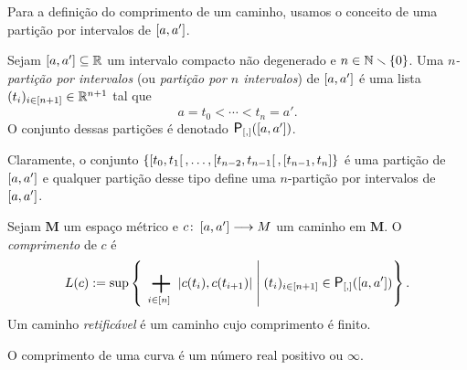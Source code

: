 Para a definição do comprimento de um caminho, usamos o conceito de uma partição por intervalos de $\left[a,\allowbreak a'\right]$.

\begin{definition}
Sejam $\left[a,\allowbreak a'\right] \subseteq \mathbb{R}$ um intervalo compacto não degenerado e $n \in \mathbb{N} \smallsetminus \{0\}$. Uma \emph{$n$-partição por intervalos} (ou \emph{partição por $n$ intervalos}) de $\left[a,\allowbreak a'\right]$ é uma lista $(t_i)_{i \in [n+1]} \in \mathbb{R}^{n+1}$ tal que
	\begin{equation*}
	a = t_0 < \cdots < t_n = a'.
	\end{equation*}
O conjunto dessas partições é denotado $\Partinter(\intff{a}{a'})$.
\end{definition}

Claramente, o conjunto $\{\left[t_0,\allowbreak t_1\right[,\ldots,\left[t_{n-2},\allowbreak t_{n-1}\right[,\left[t_{n-1},\allowbreak t_{n}\right]\}$ é uma partição de $\left[a,\allowbreak a'\right]$ e qualquer partição desse tipo define uma $n$-partição por intervalos de $\left[a,\allowbreak a'\right]$.

\begin{definition}
Sejam $\bm M$ um espaço métrico e $c\colon \allowbreak \left[a,\allowbreak a'\right] \longrightarrow M$ um caminho em $\bm M$. O \emph{comprimento} de $c$ é
	\begin{equation*}
	\compr{c} := \sup\set{\sum_{i \in [n]} \dist{c(t_i)}{c(t_{i+1})}}{(t_i)_{i \in [n+1]} \in \Partinter(\intff{a}{a'})}.
	\end{equation*}
Um caminho \emph{retificável} é um caminho cujo comprimento é finito.
\end{definition}

O comprimento de uma curva é um número real positivo ou $\infty$.

